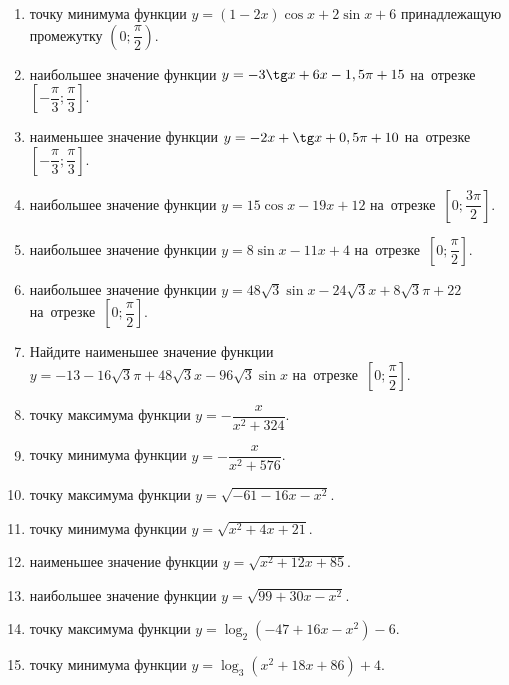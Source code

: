 \documentclass[a4paper,10pt]{article}
\begin{document}
\begin{enumerate}
\item {} точку минимума функции $y=\left(1-2x\right)\cos x +2\sin x+6$
принадлежащую промежутку $\left(0;\dfrac{\pi}{2}\right)$.

\item {} наибольшее значение функции $y=-3\tg x +6x-1,5\pi +15$ на~отрезке~$\left[-\dfrac{\pi}{3};\dfrac{\pi}{3}\right]$.

\item {} наименьшее значение функции $y=-2x +\tg x+0,5\pi+10$ на~отрезке~$\left[-\dfrac{\pi}{3};\dfrac{\pi}{3}\right]$.

\item {} наибольшее значение функции $y=15\cos x-19x+12$ на~отрезке~$\left[0;\dfrac{3\pi}{2}\right]$.

\item {} наибольшее значение функции $y=8\sin x-11x+4$ на~отрезке~$\left[0;\dfrac{\pi}{2}\right]$.

\item {} наибольшее значение функции $y=48\sqrt{3}\sin x-24\sqrt{3}x+8\sqrt{3}\pi +22$ на~отрезке~$\left[0;\dfrac{\pi}{2}\right]$.

\item Найдите наименьшее значение функции $y=-13-16\sqrt{3}\pi+48\sqrt{3}x-96\sqrt{3}\sin x$ на~отрезке~$\left[0;\dfrac{\pi}{2}\right]$.

\item {} точку максимума функции $y=-\dfrac{x}{ x^2 +324}$.

\item {} точку минимума функции $y=-\dfrac{x}{ x^2 +576}$.

\item {} точку максимума функции $y=\sqrt{-61-16x-x^2}$.

\item {} точку минимума функции $y=\sqrt{x^2+4x+21}$.

\item {} наименьшее значение функции $y=\sqrt{x^2+12x+85}$.

\item {} наибольшее значение функции $y=\sqrt{99+30x-x^2}$.

\item {} точку максимума функции $y=\log_2\left(-47+16x-x^2\right)-6$.

\item {} точку минимума функции $y=\log_3\left(x^2+18x+86\right)+4$.


\end{enumerate}
\end{document}

